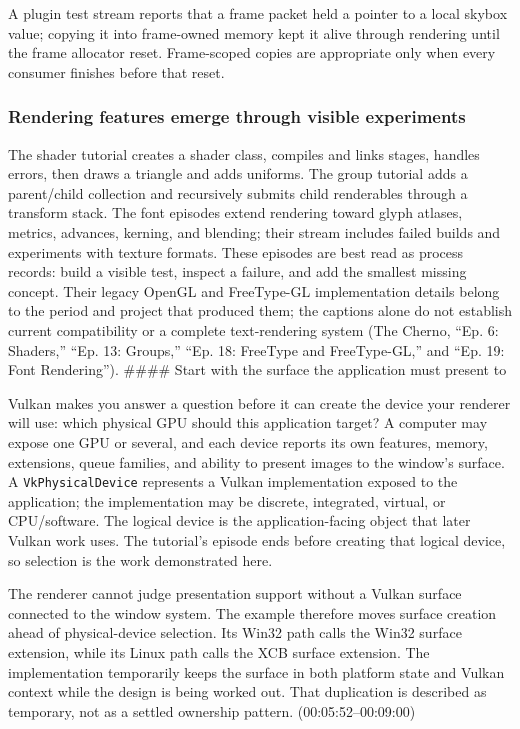 A plugin test stream reports that a frame packet held a pointer to a local skybox value; copying it into frame-owned memory kept it alive through rendering until the frame allocator reset. Frame-scoped copies are appropriate only when every consumer finishes before that reset.

\subsubsection{Rendering features emerge through visible experiments}\label{06-engine-ii-ch025-rendering-features-emerge-through-visible-experiments}

The shader tutorial creates a shader class, compiles and links stages, handles errors, then draws a triangle and adds uniforms. The group tutorial adds a parent/child collection and recursively submits child renderables through a transform stack. The font episodes extend rendering toward glyph atlases, metrics, advances, kerning, and blending; their stream includes failed builds and experiments with texture formats. These episodes are best read as process records: build a visible test, inspect a failure, and add the smallest missing concept. Their legacy OpenGL and FreeType-GL implementation details belong to the period and project that produced them; the captions alone do not establish current compatibility or a complete text-rendering system (The Cherno, ``Ep. 6: Shaders,'' ``Ep. 13: Groups,'' ``Ep. 18: FreeType and FreeType-GL,'' and ``Ep. 19: Font Rendering''). \#\#\#\# Start with the surface the application must present to

Vulkan makes you answer a question before it can create the device your renderer will use: which physical GPU should this application target? A computer may expose one GPU or several, and each device reports its own features, memory, extensions, queue families, and ability to present images to the window's surface. A \texttt{VkPhysicalDevice} represents a Vulkan implementation exposed to the application; the implementation may be discrete, integrated, virtual, or CPU/software. The logical device is the application-facing object that later Vulkan work uses. The tutorial's episode ends before creating that logical device, so selection is the work demonstrated here.

The renderer cannot judge presentation support without a Vulkan surface connected to the window system. The example therefore moves surface creation ahead of physical-device selection. Its Win32 path calls the Win32 surface extension, while its Linux path calls the XCB surface extension. The implementation temporarily keeps the surface in both platform state and Vulkan context while the design is being worked out. That duplication is described as temporary, not as a settled ownership pattern. (00:05:52--00:09:00)

